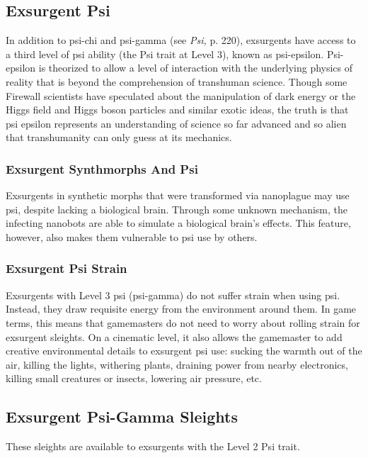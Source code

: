 \subsection{Exsurgent Psi }

In addition to psi-chi and psi-gamma (see \textit{Psi,} p. 220), 
exsurgents have access to a third level of psi ability 
(the Psi trait at Level 3), known as psi-epsilon. Psi-epsilon
is theorized to allow a level of interaction with
the underlying physics of reality that is beyond the 
comprehension of transhuman science. Though some 
Firewall scientists have speculated about the manipulation
of dark energy or the Higgs field and Higgs
boson particles and similar exotic ideas, the truth is 
that psi epsilon represents an understanding of science 
so far advanced and so alien that transhumanity can 
only guess at its mechanics.

\subsubsection{Exsurgent Synthmorphs And Psi}

Exsurgents in synthetic morphs that were transformed 
via nanoplague may use psi, despite lacking a biological
brain. Through some unknown mechanism, the
infecting nanobots are able to simulate a biological 
brain's effects. This feature, however, also makes them 
vulnerable to psi use by others.

\subsubsection{Exsurgent Psi Strain}

Exsurgents with Level 3 psi (psi-gamma) do not suffer 
strain when using psi. Instead, they draw requisite 
energy from the environment around them. In game 
terms, this means that gamemasters do not need to 
worry about rolling strain for exsurgent sleights. On a 
cinematic level, it also allows the gamemaster to add creative
environmental details to exsurgent psi use: sucking
the warmth out of the air, killing the lights, withering 
plants, draining power from nearby electronics, killing 
small creatures or insects, lowering air pressure, etc. 

\subsection{Exsurgent Psi-Gamma Sleights }

These sleights are available to exsurgents with the 
Level 2 Psi trait.

